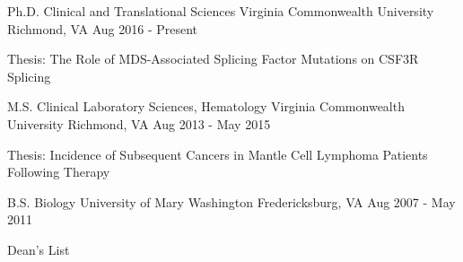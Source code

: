 

\begin{cventries}

\cventry
{Ph.D. Clinical and Translational Sciences} %
{Virginia Commonwealth University} %
{Richmond, VA} %
{Aug 2016 - Present} %
{
  \begin{cvitems} %
    \item {Thesis: The Role of MDS-Associated Splicing Factor Mutations on CSF3R Splicing}
  \end{cvitems}
}

\cventry
{M.S. Clinical Laboratory Sciences, Hematology} %
{Virginia Commonwealth University} %
{Richmond, VA} %
{Aug 2013 - May 2015} %
{
  \begin{cvitems} %
    \item {Thesis: Incidence of Subsequent Cancers in Mantle Cell Lymphoma Patients Following Therapy}
  \end{cvitems}
}

  \cventry
    {B.S. Biology} %
    {University of Mary Washington} %
    {Fredericksburg, VA} %
    {Aug 2007 - May 2011} %
    {
      \begin{cvitems} %
        \item {Dean's List}
      \end{cvitems}
    }


\end{cventries}
